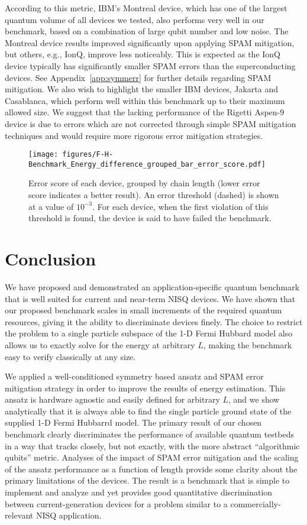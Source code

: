 \documentclass[
prx,
superscriptaddress,
twocolumn,
longbibliography
]{revtex4-1}
\begin{document}
According to this metric, IBM's Montreal device, which has one of the largest quantum volume of all devices we tested, also performs very well in our benchmark, based on a combination of large qubit number and low noise. The Montreal device results improved significantly upon applying SPAM mitigation, but others, e.g., IonQ, improve less noticeably. This is expected as the IonQ device typically has significantly smaller SPAM errors than the superconducting devices. See Appendix~\ref{app:symmerr} for further details regarding SPAM mitigation. We also wish to highlight the smaller IBM devices, Jakarta and Casablanca, which perform well within this benchmark up to their maximum allowed size. We suggest that the lacking performance of the Rigetti Aspen-9 device is due to errors which are not corrected through simple SPAM mitigation techniques and would require more rigorous error mitigation strategies. 

\begin{figure*}[!htb]
\texttt{[image: figures/F-H-Benchmark\_Energy\_difference\_grouped\_bar\_error\_score.pdf]}
\caption{Error score of each device, grouped by chain length (lower error score indicates a better result). An error threshold (dashed) is shown at a value of $10^{-3}$. For each device, when the first violation of this threshold is found, the device is said to have failed the benchmark.}
\label{fig:FH_diff}
\end{figure*}

\section{Conclusion}
\label{sec:Discussion}
We have proposed and demonstrated an application-specific quantum benchmark that is well suited for current and near-term NISQ devices. 
We have shown that our proposed benchmark scales in small increments of the required quantum resources, giving it the ability to discriminate devices finely. The choice to restrict the problem to a single particle subspace of the 1-D Fermi Hubbard model also allows us to exactly solve for the energy at arbitrary $L$, making the benchmark easy to verify classically at any size.

We applied a well-conditioned symmetry based ansatz and SPAM error mitigation strategy in order to improve the results of energy estimation. This ansatz is hardware agnostic and easily defined for arbitrary $L$, and we show analytically that it is always able to find the single particle ground state of the supplied 1-D Fermi Hubbarrd model. The primary result of our chosen benchmark clearly discriminates the performance of available quantum testbeds in a way that tracks closely, but not exactly, with the more abstract ``algorithmic qubits'' metric. Analyses of the impact of SPAM error mitigation and the scaling of the ansatz performance as a function of length provide some clarity about the primary limitations of the devices. The result is a benchmark that is simple to implement and analyze and yet provides good quantitative discrimination between current-generation devices for a problem similar to a commercially-relevant NISQ application.
\end{document}
